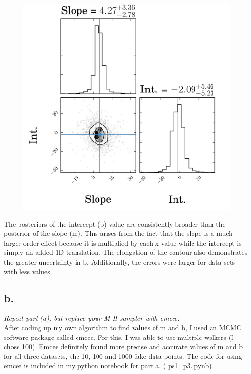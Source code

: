 \documentclass[english,12pt]{article}
\begin{document}
\begin{figure}[H]
\endminipage\hfill
{}%
  \includegraphics[width=\linewidth]{corner_1000_data_points.png}
\endminipage\hfill
\end{figure}

The posteriors of the intercept (b) value are consistently broader than the posterior of the slope (m). This arises from the fact that the slope is a much larger order effect because it is multiplied by each x value while the intercept is simply an added 1D translation. The elongation of the contour also demonstrates the greater uncertainty in b.  Additionally, the errors were larger for data sets with less values.

\subsection*{b.}
\textit{Repeat part (a), but replace your M-H sampler with emcee.}\\
After coding up my own algorithm to find values of m and b, I used an MCMC software package called emcee. For this, I was able to use multiple walkers (I chose 100). Emcee definitely found more precise and accurate values of m and b for all three datasets, the 10, 100 and 1000 fake data points. The code for using emcee is included in my python notebook for part a. ( ps1\_p3.ipynb).
\end{document}
